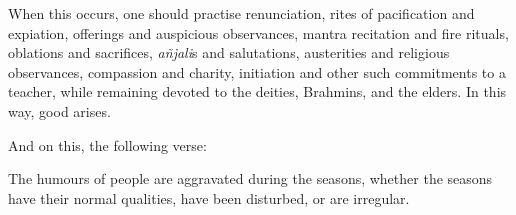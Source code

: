 \begin{translation}
\item [19]
When this occurs, %
one should practise renunciation, %
rites of pacification and expiation, %
offerings and auspicious observances, %
mantra recitation and fire rituals, %
oblations and sacrifices, %
\emph{añjali}s and salutations,%
austerities and religious observances, %
compassion and charity, %
initiation and other such commitments to a teacher, %
while remaining devoted to the deities, Brahmins, and the elders. %
In this way, good arises. %

\item [20]
And on this, the following verse:

The humours of people are aggravated during the seasons, whether the seasons have their normal qualities, have been disturbed, %
or are irregular. 
\end{translation} 